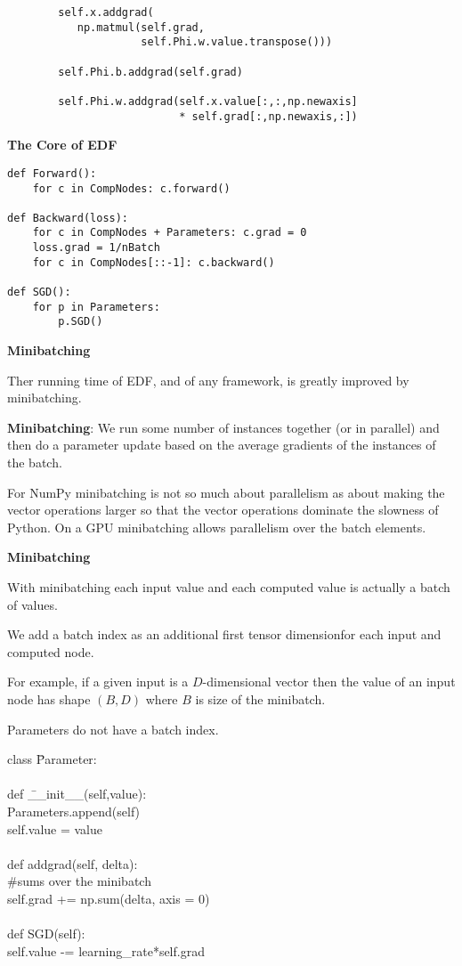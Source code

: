 \documentclass[landscape]{article}
\newcommand{\slide}[1]{
  \vfill
  \centerline{\Large\thepage}
  \eject
  \centerline{\bf #1}
  \vfill}
\begin{document}
{\begin{verbatim}
        self.x.addgrad(
           np.matmul(self.grad,
                     self.Phi.w.value.transpose()))

        self.Phi.b.addgrad(self.grad)

        self.Phi.w.addgrad(self.x.value[:,:,np.newaxis]
                           * self.grad[:,np.newaxis,:])
\end{verbatim}

\slide{The Core of EDF}

\begin{verbatim}
def Forward():
    for c in CompNodes: c.forward()

def Backward(loss):
    for c in CompNodes + Parameters: c.grad = 0
    loss.grad = 1/nBatch
    for c in CompNodes[::-1]: c.backward()

def SGD():
    for p in Parameters:
        p.SGD()
\end{verbatim}
\vfill

\slide{Minibatching}

Ther running time of EDF, and of any framework, is greatly improved by minibatching.

 \vfill
{\bf Minibatching}: We run some number of instances together (or in parallel) and then do a parameter update based on the average
gradients of the instances of the batch.

\vfill
For NumPy minibatching is not so much about parallelism as about making the vector operations larger so that the vector operations dominate
the slowness of Python.  On a GPU minibatching allows parallelism over the batch elements.
\vfill

\slide{Minibatching}
\vfill
With minibatching each input value and each computed value is actually a batch of values.

\vfill
We add a batch index as an additional first tensor dimensionfor each input and computed node.

\vfill
For example, if a given input is a $D$-dimensional vector then the value of an input node
has shape $(B,D)$ where $B$ is size of the minibatch.

\vfill
Parameters do not have a batch index.

\vfill
\eject
\vfill
\begin{tabbing}
class \=Parameter: \\
    \\
    \>def \=\_\_init\_\_(self,value): \\
        \>\>Parameters.append(self) \\
        \>\>self.value = value \\
\\
    \>def \>addgrad(self, delta): \\
          \>\>\#sums over the minibatch \\
    \>\>self.grad += np.sum(delta, axis = 0) \\
    \\
    \>def \>SGD(self): \\
    \>\>self.value -= learning\_rate*self.grad
\end{tabbing}

}
\end{document}
